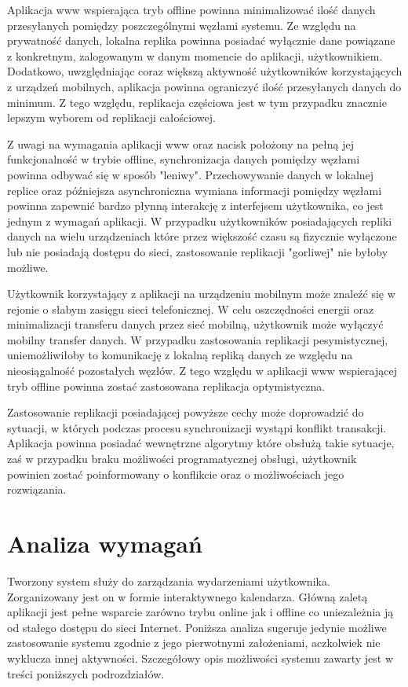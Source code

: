 Aplikacja www wspierająca tryb offline powinna minimalizować ilość danych przesyłanych pomiędzy poszczególnymi węzłami systemu. Ze względu na prywatność danych, lokalna replika powinna posiadać wyłącznie dane powiązane z konkretnym, zalogowanym w danym momencie do aplikacji, użytkownikiem. Dodatkowo, uwzględniając coraz większą aktywność użytkowników korzystających z urządzeń mobilnych, aplikacja powinna ograniczyć ilość przesyłanych danych do minimum. Z tego względu, replikacja częściowa jest w tym przypadku znacznie lepszym wyborem od replikacji całościowej.

Z uwagi na wymagania aplikacji www oraz nacisk położony na pełną jej funkcjonalność w trybie offline, synchronizacja danych pomiędzy węzłami powinna odbywać się w sposób "leniwy". Przechowywanie danych w lokalnej replice oraz późniejsza asynchroniczna wymiana informacji pomiędzy węzłami powinna zapewnić bardzo płynną interakcję z interfejsem użytkownika, co jest jednym z wymagań aplikacji.  W przypadku użytkowników posiadających repliki danych na wielu urządzeniach które przez większość czasu są fizycznie wyłączone lub nie posiadają dostępu do sieci, zastosowanie replikacji "gorliwej" nie byłoby możliwe.

Użytkownik korzystający z aplikacji na urządzeniu mobilnym może znaleźć się w rejonie o słabym zasięgu sieci telefonicznej. W celu oszczędności energii oraz minimalizacji transferu danych przez sieć mobilną, użytkownik może wyłączyć mobilny transfer danych. W przypadku zastosowania replikacji pesymistycznej, uniemożliwiłoby to komunikację z lokalną repliką danych ze względu na nieosiągalność pozostałych węzłów. Z tego względu w aplikacji www wspierającej tryb offline powinna zostać zastosowana replikacja optymistyczna.

Zastosowanie replikacji posiadającej powyższe cechy może doprowadzić do sytuacji, w których podczas procesu synchronizacji wystąpi konflikt transakcji. Aplikacja powinna posiadać wewnętrzne algorytmy które obsłużą takie sytuacje, zaś w przypadku braku możliwości programatycznej obsługi, użytkownik powinien zostać poinformowany o konflikcie oraz o możliwościach jego rozwiązania.

\section{Analiza wymagań}
\label{sec:analizaWymagan}

Tworzony system służy do zarządzania wydarzeniami użytkownika. Zorganizowany jest on w formie interaktywnego kalendarza. Główną zaletą aplikacji jest pełne wsparcie zarówno trybu online jak i offline co uniezależnia ją od stałego dostępu do sieci Internet. Poniższa analiza sugeruje jedynie możliwe zastosowanie systemu zgodnie z jego
pierwotnymi założeniami, aczkolwiek nie wyklucza innej aktywności. Szczegółowy opis możliwości systemu zawarty jest w treści poniższych podrozdziałów.

